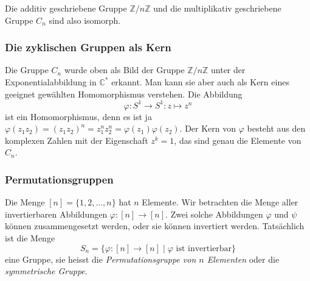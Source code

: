 Die additiv geschriebene Gruppe $\mathbb{Z}/n\mathbb{Z}$ und
die multiplikativ geschriebene Gruppe $C_n$ sind also isomorph.

%
%
\subsubsection{Die zyklischen Gruppen als Kern}
Die Gruppe $C_n$ wurde oben als Bild der Gruppe
$\mathbb{Z}/n\mathbb{Z}$ unter der Exponentialabbildung 
in $\mathbb{C}^*$ erkannt.
Man kann sie aber auch als Kern eines geeignet gewählten Homomorphismus
verstehen.
Die Abbildung
\[
\varphi
\colon
S^1\to S^1
:
z\mapsto z^n
\]
ist ein Homomorphismus, denn es ist ja $\varphi(z_1z_2)=(z_1z_2)^n
= z_1^nz_2^n=\varphi(z_1)\varphi(z_2)$.
Der Kern von $\varphi$ besteht aus den komplexen Zahlen mit der 
Eigenschaft $z^k=1$, das sind genau die Elemente von $C_n$.

%
%
\subsubsection{Permutationsgruppen}
Die Menge $[n]=\{1,2,\dots,n\}$ hat $n$ Elemente.
Wir betrachten die Menge aller invertierbaren Abbildungen
$\varphi\colon [n] \to [n]$.
Zwei solche Abbildungen $\varphi$ und $\psi$ können zusammengesetzt
werden, oder sie können invertiert werden.
Tatsächlich ist die Menge 
\[
S_n = \{\varphi\colon [n] \to [n]\mid \text{$\varphi$ ist invertierbar} \}
\]
eine Gruppe, sie heisst die {\em Permutationsgruppe von $n$ Elementen}
oder die {\em symmetrische Gruppe}.
%
%
%

